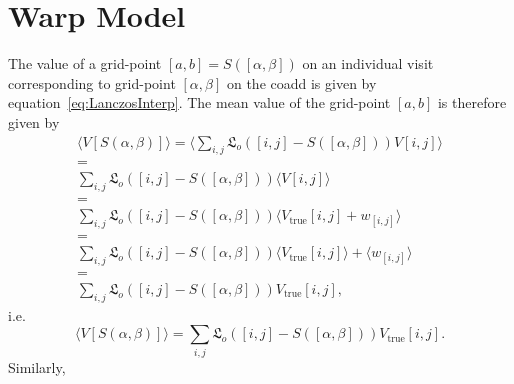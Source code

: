 \documentclass[times]{aastex6}
\begin{document}
\section{Warp Model}
The value of a grid-point $[a,b] = S([\alpha, \beta])$ on an individual visit corresponding to grid-point $[\alpha, \beta]$ on the coadd is given by equation~\eqref{eq:LanczosInterp}. The mean value of the grid-point $[a,b]$ is therefore given by
\begin{multline*}
  \langle V[S(\alpha, \beta)] \rangle = \langle \sum_{i,j}\mathfrak{L}_{o}([i,j] - S([\alpha, \beta]))V[i,j] \rangle \\ = \\ \sum_{i,j}\mathfrak{L}_{o}([i,j] - S([\alpha, \beta])) \langle V[i,j] \rangle \\ = \\ \sum_{i,j}\mathfrak{L}_{o}([i,j] - S([\alpha, \beta])) \langle V_{\mathrm{true}}[i,j] + w_{[i,j]} \rangle \\ = \\ \sum_{i,j}\mathfrak{L}_{o}([i,j] - S([\alpha, \beta])) \langle V_{\mathrm{true}}[i,j] \rangle + \langle w_{[i,j]} \rangle \\ = \\ \sum_{i,j}\mathfrak{L}_{o}([i,j] - S([\alpha, \beta]))V_{\mathrm{true}}[i,j],
\end{multline*}
i.e.
\begin{equation}\label{eq:VisitCoaddMean}
  \langle V[S(\alpha, \beta)] \rangle = \sum_{i,j}\mathfrak{L}_{o}([i,j] - S([\alpha, \beta]))V_{\mathrm{true}}[i,j].
\end{equation}
Similarly,
\end{document}
